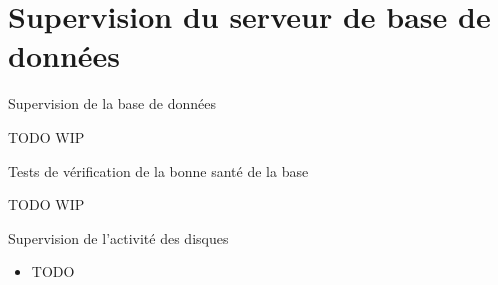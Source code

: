 
\section{Supervision du serveur de base de données}


\begin{frame}[fragile]{Supervision de la base de données}

   TODO
   WIP

\begin{toile}
\end{toile}

\end{frame}


\begin{frame}[fragile]{Tests de vérification de la bonne santé de la base}

   TODO
   WIP

\begin{toile}
\end{toile}

\end{frame}


\begin{frame}{Supervision de l'activité des disques}

\begin{itemize}

   \item TODO

\end{itemize}

\begin{toile}
\end{toile}

\end{frame}



